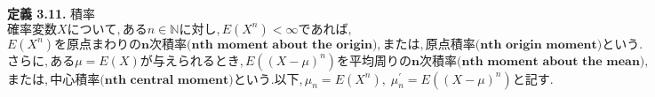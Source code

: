 \documentclass[dvipdfmx,10pt, a4j]{jarticle}
\theoremstyle{definition}
\begin{document}
\noindent
\textbf{定義 3.11.} 積率\\
$確率変数Xについて, ある n \in \mathbb{N} に対し, E(X^n) < \infty であれば,$\\
$E(X^n) を\textbf{原点まわりのn次積率(nth moment about the origin)}, または, \textbf{原点積率(nth origin moment)}という.$\\
$さらに, ある \mu = E(X) が与えられるとき, E((X-\mu)^n)を \textbf{平均周りのn次積率(nth moment about the mean)},$\\
$または, \textbf{中心積率(nth central moment)}という. 以下, \mu_n = E(X^{n}),\; \mu_n^{\prime} = E((X-\mu)^n)と記す.$\\

\end{document}
